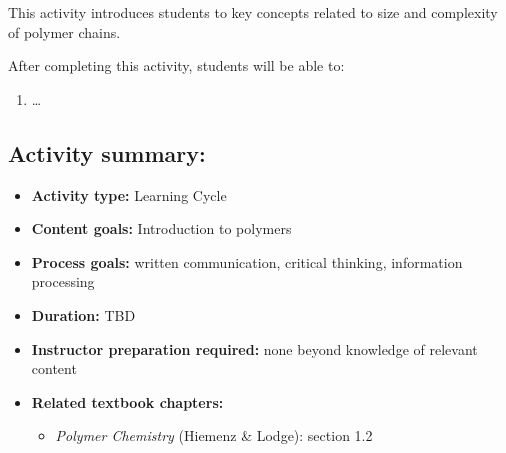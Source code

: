 %
%
%
%

\renewcommand{\figpath}{content/intro/size-and-complexity/figs}
\renewcommand{\labelbase}{size-and-complexity}

\begin{activity}

\begin{instructornotes}

	This activity introduces students to key concepts related to size and complexity of polymer chains.
	
	After completing this activity, students will be able to:
			\begin{enumerate}
				\item \dots
			\end{enumerate}
			
	\subsection*{Activity summary:}
	\begin{itemize}
		\item \textbf{Activity type:} Learning Cycle
		\item \textbf{Content goals:} Introduction to polymers
		\item \textbf{Process goals:} %
			written communication, critical thinking, information processing
		\item \textbf{Duration:} TBD
		\item \textbf{Instructor preparation required:} none beyond knowledge of relevant content
		\item \textbf{Related textbook chapters:}
			\begin{itemize}
				\item \emph{Polymer Chemistry} (Hiemenz \& Lodge): section 1.2
			\end{itemize}
	\end{itemize}


\end{instructornotes}
\end{activity}
